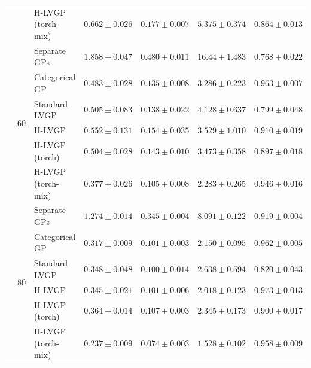 \begin{table}[htbp]
\begin{tabular}{lllrrrr}
 &  & H-LVGP (torch-mix) & \colorbox{green!20}{\boldmath$0.662 \pm 0.026$} & \colorbox{green!20}{\boldmath$0.177 \pm 0.007$} & \colorbox{green!20}{\boldmath$5.375 \pm 0.374$} & $0.864 \pm 0.013$ \\
\cmidrule(lr){2-7}
 & \multirow{6}{*}{60} & Separate GPs & $1.858 \pm 0.047$ & $0.480 \pm 0.011$ & $16.44 \pm 1.483$ & $0.768 \pm 0.022$ \\
 &  & Categorical GP & $0.483 \pm 0.028$ & $0.135 \pm 0.008$ & $3.286 \pm 0.223$ & $0.963 \pm 0.007$ \\
 &  & Standard LVGP & $0.505 \pm 0.083$ & $0.138 \pm 0.022$ & $4.128 \pm 0.637$ & $0.799 \pm 0.048$ \\
 &  & H-LVGP & $0.552 \pm 0.131$ & $0.154 \pm 0.035$ & $3.529 \pm 1.010$ & $0.910 \pm 0.019$ \\
 &  & H-LVGP (torch) & $0.504 \pm 0.028$ & $0.143 \pm 0.010$ & $3.473 \pm 0.358$ & $0.897 \pm 0.018$ \\
 &  & H-LVGP (torch-mix) & \colorbox{green!20}{\boldmath$0.377 \pm 0.026$} & \colorbox{green!20}{\boldmath$0.105 \pm 0.008$} & \colorbox{green!20}{\boldmath$2.283 \pm 0.265$} & \colorbox{green!20}{\boldmath$0.946 \pm 0.016$} \\
\cmidrule(lr){2-7}
 & \multirow{6}{*}{80} & Separate GPs & $1.274 \pm 0.014$ & $0.345 \pm 0.004$ & $8.091 \pm 0.122$ & $0.919 \pm 0.004$ \\
 &  & Categorical GP & $0.317 \pm 0.009$ & $0.101 \pm 0.003$ & $2.150 \pm 0.095$ & $0.962 \pm 0.005$ \\
 &  & Standard LVGP & $0.348 \pm 0.048$ & $0.100 \pm 0.014$ & $2.638 \pm 0.594$ & $0.820 \pm 0.043$ \\
 &  & H-LVGP & $0.345 \pm 0.021$ & $0.101 \pm 0.006$ & $2.018 \pm 0.123$ & $0.973 \pm 0.013$ \\
 &  & H-LVGP (torch) & $0.364 \pm 0.014$ & $0.107 \pm 0.003$ & $2.345 \pm 0.173$ & $0.900 \pm 0.017$ \\
 &  & H-LVGP (torch-mix) & \colorbox{green!20}{\boldmath$0.237 \pm 0.009$} & \colorbox{green!20}{\boldmath$0.074 \pm 0.003$} & \colorbox{green!20}{\boldmath$1.528 \pm 0.102$} & \colorbox{green!20}{\boldmath$0.958 \pm 0.009$} \\
\bottomrule
\end{tabular}
\end{table}
